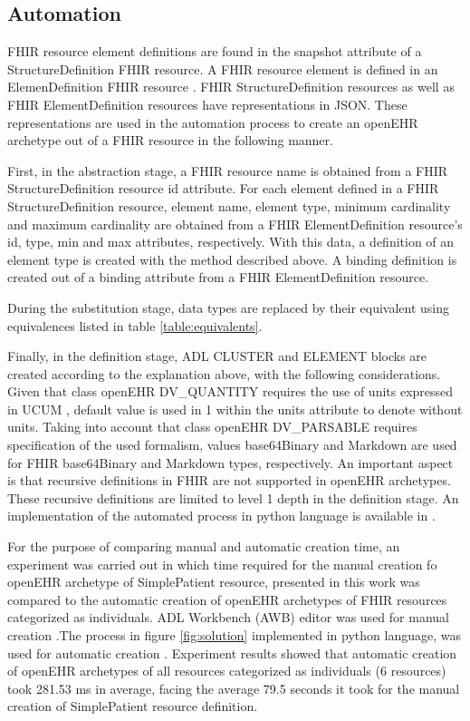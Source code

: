 \subsection{Automation}

FHIR resource element definitions are found in the snapshot attribute of a StructureDefinition FHIR resource. A FHIR resource element is defined in an ElemenDefinition FHIR resource \cite{FHIRElementDefinition}. FHIR StructureDefinition resources as well as FHIR ElementDefinition resources have representations in JSON. These representations are used in the automation process to create an openEHR archetype out of a FHIR resource in the following manner.

First, in the abstraction stage, a FHIR resource name is obtained from a FHIR StructureDefinition resource id attribute. For each element defined in a FHIR StructureDefinition resource, element name, element type, minimum cardinality and maximum cardinality are obtained from a FHIR ElementDefinition resource's  id, type, min and max attributes, respectively. With this data, a definition of an element type is created with the method described above. A binding definition is created out of a binding attribute from a FHIR ElementDefinition resource.

During the substitution stage, data types are replaced by their equivalent using equivalences listed in table \ref{table:equivalents}.

Finally, in the definition stage, ADL CLUSTER and ELEMENT blocks are created according to the explanation above, with the following considerations. Given that class openEHR DV\_QUANTITY requires the use of units expressed in UCUM \cite{UCUM}, default value is used in 1 within the units attribute to denote without units. Taking into account that class openEHR DV\_PARSABLE requires specification of the used formalism, values base64Binary and Markdown are used for FHIR base64Binary and Markdown types, respectively. An important aspect is that recursive definitions in FHIR are not supported in openEHR archetypes. These recursive definitions are limited to level 1 depth in the definition stage. An implementation of the automated process in python language is available in \cite{PythonImplementation}.

For the purpose of comparing manual and automatic creation time, an experiment was carried out in which time required for the manual creation fo openEHR archetype of SimplePatient resource, presented in this work was compared to the automatic creation of openEHR archetypes of FHIR resources categorized as individuals. ADL Workbench (AWB) editor was used for manual creation \cite{ADLWORKbench}.The process in figure \ref{fig:solution} implemented in python language, was used for automatic creation \cite{PythonImplementation}. Experiment results showed that automatic creation of openEHR archetypes of all resources categorized as individuals (6 resources) took 281.53 ms in average, facing the average 79.5 seconds it took for the manual creation of SimplePatient resource definition.
